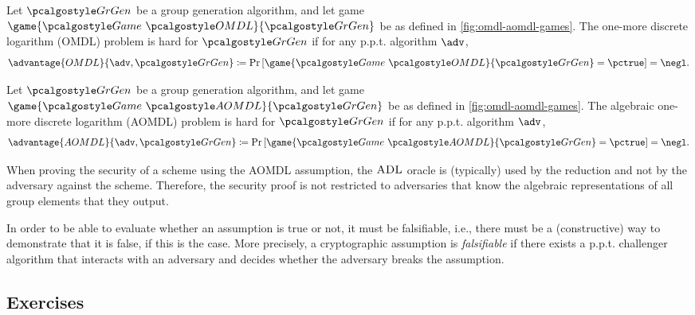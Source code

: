 \begin{definition}
  Let $\grgen$ be a group generation algorithm, and let game $\game{\Game~\algo{OMDL}}{\grgen}$ be as defined in \autoref{fig:omdl-aomdl-games}.
  The one-more discrete logarithm (OMDL) problem is hard for $\grgen$ if for any p.p.t. algorithm $\adv$,
  \[
  \advantage{OMDL}{\adv, \grgen} \defeq \pr{\game{\Game~\algo{OMDL}}{\grgen} = \pctrue} = \negl.
  \]
\end{definition}

\begin{definition}
  Let $\grgen$ be a group generation algorithm, and let game $\game{\Game~\algo{AOMDL}}{\grgen}$ be as defined in \autoref{fig:omdl-aomdl-games}.
  The algebraic one-more discrete logarithm (AOMDL) problem is hard for $\grgen$ if for any p.p.t. algorithm $\adv$,
  \[
  \advantage{AOMDL}{\adv, \grgen} \defeq \pr{\game{\Game~\algo{AOMDL}}{\grgen} = \pctrue} = \negl.
  \]
\end{definition}

\begin{remark}
  When proving the security of a scheme using the AOMDL assumption, the ${\normalfont\textsc{ADL}}$ oracle is (typically) used by the reduction and not by the adversary against the scheme.
  Therefore, the security proof is not restricted to adversaries that know the algebraic representations of all group elements that they output.
\end{remark}

\begin{remark}
  In order to be able to evaluate whether an assumption is true or not, it must be falsifiable, i.e., there must be a (constructive) way to demonstrate that it is false, if this is the case.
  More precisely, a cryptographic assumption is \emph{falsifiable} if there exists a p.p.t. challenger algorithm that interacts with an adversary and decides whether the adversary breaks the assumption.
\end{remark}

\subsection{Exercises}

